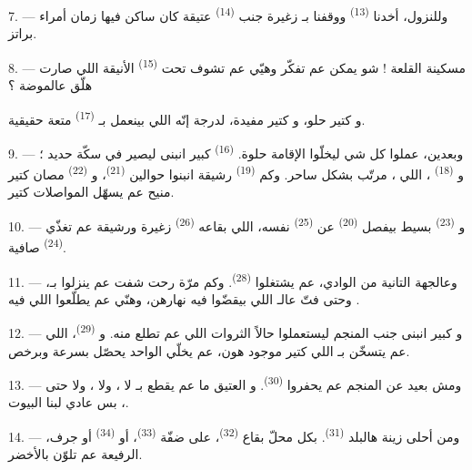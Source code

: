 7. --- وللنزول، أخدنا  \textsuperscript{(13)} ووقفنا
بـ زغيرة جنب  \textsuperscript{(14)}
 عتيقة كان ساكن فيها زمان أمراء براتز.

8. --- مسكينة القلعة ! شو يمكن عم تفكّر وهيّي عم تشوف تحت
 \textsuperscript{(15)} الأنيقة اللي صارت
هلّق  عالموضة ؟

و كتير حلو، و كتير مفيدة، لدرجة
إنّه  اللي بينعمل بـ \textsuperscript{(17)}
متعة حقيقية.

\VUsaut{3.0mm}
\VUsaut{3.0mm}

9. --- وبعدين، عملوا كل شي ليخلّوا الإقامة حلوة. 
\textsuperscript{(16)} كبير انبنى ليصير في سكّة حديد ؛
و \textsuperscript{(18)} ، اللي
، مرتّب بشكل ساحر. وكم 
\textsuperscript{(19)} رشيقة انبنوا حوالين 
\textsuperscript{(21)}، و \textsuperscript{(22)} مصان
كتير منيح عم يسهّل المواصلات كتير.

10. --- و \textsuperscript{(23)} بسيط بيفصل 
\textsuperscript{(20)} عن  \textsuperscript{(25)} نفسه، اللي
بقاعه  \textsuperscript{(26)} زغيرة ورشيقة عم تغذّي
 \textsuperscript{(24)} صافية.

11. --- وعالجهة التانية من الوادي، عم يشتغلوا 
\textsuperscript{(28)}. وكم مرّة رحت شفت  عم ينزلوا
بـ، وحتى فتّ عالـ اللي بيقضّوا فيه نهارهن،
وهنّي عم يطلّعوا  اللي فيه .

12. --- و كبير انبنى جنب المنجم ليستعملوا حالاً الثروات
اللي عم تطلع منه. و \textsuperscript{(29)}، اللي عم
يتسخّن بـ اللي كتير موجود هون، عم يخلّي الواحد
يحصّل  بسرعة وبرخص.

13. --- ومش بعيد عن المنجم عم يحفروا  \textsuperscript{(30)}.
و العتيق ما عم يقطع بـ لا
، ولا ، ولا حتى ، بس
 عادي لبنا البيوت.

14. --- ومن أحلى زينة هالبلد  \textsuperscript{(31)}. بكل
محلّ بقاع  \textsuperscript{(32)}، على ضفّة
 \textsuperscript{(33)}، أو 
\textsuperscript{(34)} أو جرف،  الرفيعة عم تلوّن بالأخضر.


